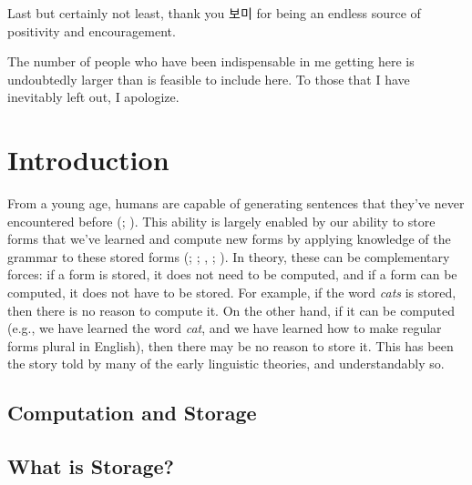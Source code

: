 \documentclass[
  letterpaper,
  DIV=11,
  numbers=noendperiod,
  nottoc,
  oneside]{scrreprt}
\begin{document}
Last but certainly not least, thank you 보미 for being an endless source
of positivity and encouragement.

The number of people who have been indispensable in me getting here is
undoubtedly larger than is feasible to include here. To those that I
have inevitably left out, I apologize.


\chapter{Introduction}\label{introduction}


From a young age, humans are capable of generating sentences that
they've never encountered before
(;
). This ability
is largely enabled by our ability to store forms that we've learned and
compute new forms by applying knowledge of the grammar to these stored
forms (;
;
,
;
). In theory,
these can be complementary forces: if a form is stored, it does not need
to be computed, and if a form can be computed, it does not have to be
stored. For example, if the word \emph{cats} is stored, then there is no
reason to compute it. On the other hand, if it can be computed (e.g., we
have learned the word \emph{cat}, and we have learned how to make
regular forms plural in English), then there may be no reason to store
it. This has been the story told by many of the early linguistic
theories, and understandably so.

\section{Computation and Storage}\label{computation-and-storage}

\section{What is Storage?}\label{what-is-storage}
\end{document}
